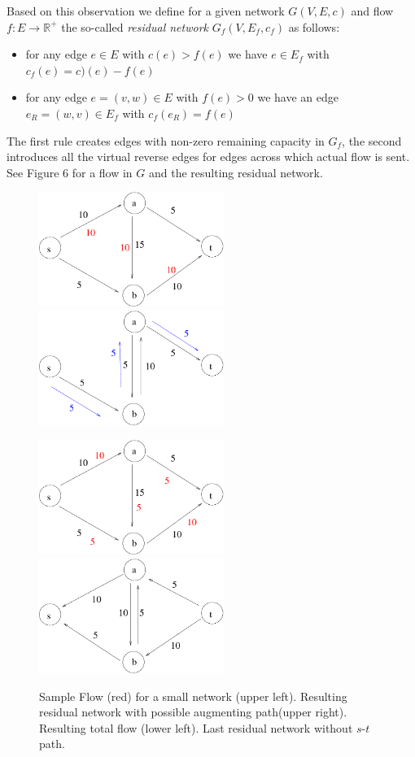 \documentclass{article}
\begin{document}
Based on this observation we define for a given network $G(V,E,c)$ and flow $f:E\rightarrow \mathbb{R}^+$ the so-called \emph{residual network} $G_f(V, E_f, c_f)$ as follows:
\begin{itemize}
\item for any edge $e\in E$ with $c(e)>f(e)$ we have $e\in E_f$ with $c_f(e)=c)(e)-f(e)$
\item for any edge $e=(v,w)\in E$ with $f(e)>0$ we have an edge $e_R=(w,v)\in E_f$ with $c_f(e_R)=f(e)$
\end{itemize}
The first rule creates edges with non-zero remaining capacity in $G_f$, the second introduces all the virtual reverse edges for edges across which actual flow is sent. See Figure 6 for a flow in $G$ and the resulting residual network.
\begin{figure}
\begin{center}
\includegraphics[width=6cm]{Figs/flow1.pdf} 
\hspace{1cm}
\includegraphics[width=6cm]{Figs/flowRN1.pdf}

\vspace{1cm}
\includegraphics[width=6cm]{Figs/flowRN2.pdf}
\hspace{1cm}
\includegraphics[width=6cm]{Figs/flowRN3.pdf}
\end{center}
\caption{Sample Flow (red) for a small network (upper left). Resulting residual network with possible augmenting path(upper right). Resulting total flow (lower left). Last residual network without $s$-$t$ path.}\label{fig:flowRN}
\end{figure}
\end{document}
